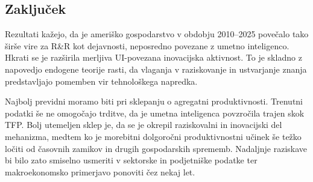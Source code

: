 \documentclass[12pt,a4paper]{article}
\begin{document}
\subsection{Zaključek}

Rezultati kažejo, da je ameriško gospodarstvo v obdobju 2010--2025 povečalo tako širše vire za R\&R kot dejavnosti, neposredno povezane z umetno inteligenco. Hkrati se je razširila merljiva UI-povezana inovacijska aktivnost. To je skladno z napovedjo endogene teorije rasti, da vlaganja v raziskovanje in ustvarjanje znanja predstavljajo pomemben vir tehnološkega napredka.

Najbolj previdni moramo biti pri sklepanju o agregatni produktivnosti. Trenutni podatki še ne omogočajo trditve, da je umetna inteligenca povzročila trajen skok TFP. Bolj utemeljen sklep je, da se je okrepil raziskovalni in inovacijski del mehanizma, medtem ko je morebitni dolgoročni produktivnostni učinek še težko ločiti od časovnih zamikov in drugih gospodarskih sprememb. Nadaljnje raziskave bi bilo zato smiselno usmeriti v sektorske in podjetniške podatke ter makroekonomsko primerjavo ponoviti čez nekaj let.

\newpage
\printbibliography[title={Literatura in viri}, heading=bibintoc]
\end{document}
